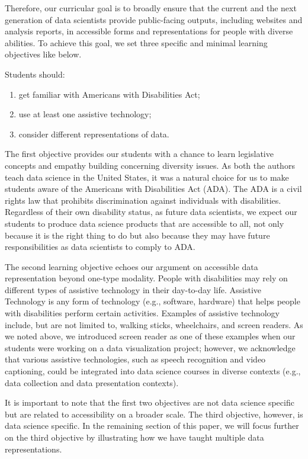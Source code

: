 \documentclass[12pt]{article}
\providecommand{\tightlist}{%
  \setlength{\itemsep}{0pt}\setlength{\parskip}{0pt}}
\begin{document}
Therefore, our curricular goal is to broadly ensure that the current and the next generation of data scientists provide public-facing outputs, including websites and analysis reports, in accessible forms and representations for people with diverse abilities. To achieve this goal, we set three specific and minimal learning objectives like below.

Students should:

\begin{enumerate}
\def\labelenumi{\arabic{enumi}.}
\tightlist
\item
  get familiar with Americans with Disabilities Act;
\item
  use at least one assistive technology;
\item
  consider different representations of data.
\end{enumerate}

The first objective provides our students with a chance to learn legislative concepts and empathy building concerning diversity issues. As both the authors teach data science in the United States, it was a natural choice for us to make students aware of the Americans with Disabilities Act (ADA).
The ADA is a civil rights law that prohibits discrimination against individuals with disabilities.
Regardless of their own disability status, as future data scientists, we expect our students to produce data science products that are accessible to all, not only because it is the right thing to do but also because they may have future responsibilities as data scientists to comply to ADA.

The second learning objective echoes our argument on accessible data representation beyond one-type modality. People with disabilities may rely on different types of assistive technology in their day-to-day life.
Assistive Technology is any form of technology (e.g., software, hardware) that helps people with disabilities perform certain activities. Examples of assistive technology include, but are not limited to, walking sticks, wheelchairs, and screen readers. As we noted above, we introduced screen reader as one of these examples when our students were working on a data visualization project; however, we acknowledge that various assistive technologies, such as speech recognition and video captioning, could be integrated into data science courses in diverse contexts (e.g., data collection and data presentation contexts).

It is important to note that the first two objectives are not data science specific but are related to accessibility on a broader scale.
The third objective, however, is data science specific. In the remaining section of this paper, we will focus further on the third objective by illustrating how we have taught multiple data representations.
\end{document}
